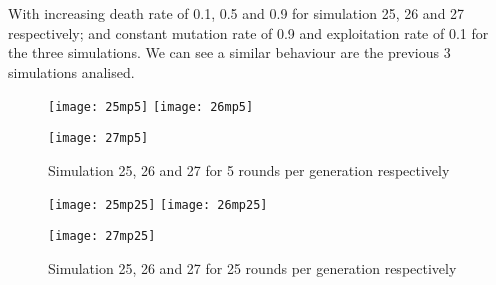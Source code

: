 \documentclass{book}
\begin{document}
With increasing death rate of 0.1, 0.5 and 0.9 for simulation 25, 26 and 27 respectively; and constant mutation rate of 0.9 and exploitation rate of 0.1 for the three simulations. We can see a similar behaviour are the previous 3 simulations analised.
\begin{figure}[H]       
    \begin{center}
    \mbox{\texttt{[image: 25mp5]}}   
    \hspace{0px}
    \mbox{\texttt{[image: 26mp5]}}
    \hspace{40px}
    \end{center}
    \begin{center}
    \mbox{\texttt{[image: 27mp5]}}
    \end{center}
    \caption{Simulation 25, 26 and 27 for 5 rounds per generation respectively}
    \label{simulation252627mp5}
\end{figure}

\begin{figure}[H]       
    \begin{center}
    \mbox{\texttt{[image: 25mp25]}}   
    \hspace{0px}
    \mbox{\texttt{[image: 26mp25]}}
    \hspace{40px}
    \end{center}
    \begin{center}
    \mbox{\texttt{[image: 27mp25]}}
    \end{center}
    \caption{Simulation 25, 26 and 27 for 25 rounds per generation respectively}
    \label{simulation252627mp25}
\end{figure}
\end{document}
